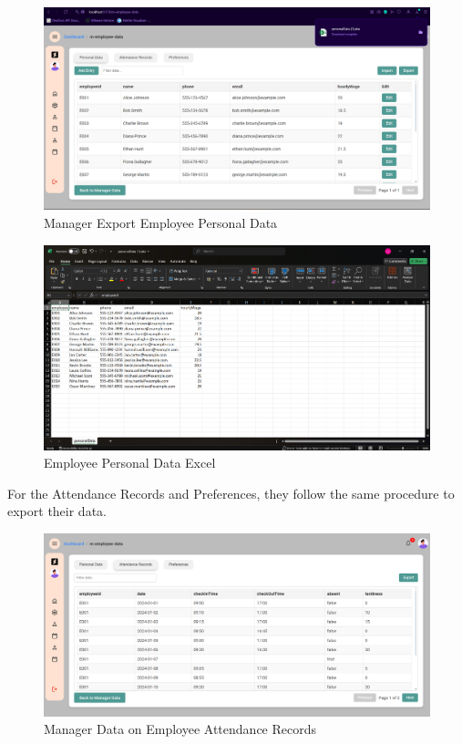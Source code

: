 \documentclass[a4paper,12pt, oneside]{report}
\begin{document}
\begin{itemize}
    \begin{figure}[H]
    \centering
    \includegraphics[width=0.8\columnwidth]{ManagerPages/ManagerEmployeeData5.png}
    \caption{Manager Export Employee Personal Data}
    \label{fig:manager-employee-data-personal-export}
    \end{figure}

    \begin{figure}[H]
    \centering
    \includegraphics[width=0.8\columnwidth]{ManagerPages/ManagerEmployeeData6.png}
    \caption{Employee Personal Data Excel}
    \label{fig:manager-excel-personal-data}
    \end{figure}

    For the Attendance Records and Preferences, they follow the same procedure to export their data.

    \begin{figure}[H]
    \centering
    \includegraphics[width=0.8\columnwidth]{ManagerPages/ManagerEmployeeData7.png}
    \caption{Manager Data on Employee Attendance Records}
    \label{fig:manager-employee-data-attendance}
    \end{figure}


\end{itemize}
\end{document}
